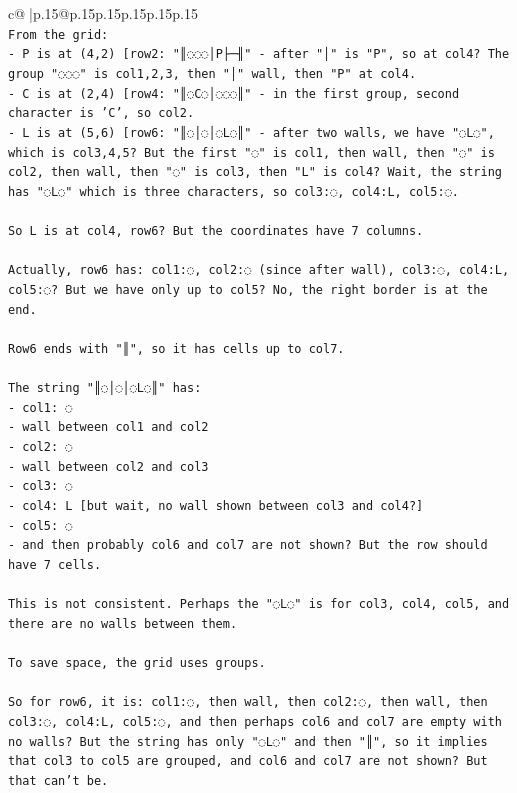 \documentclass{article}
\begin{document}
{\begin{supertabular}{c@{$\;$}|p{.15\linewidth}@{}p{.15\linewidth}p{.15\linewidth}p{.15\linewidth}p{.15\linewidth}p{.15\linewidth}}
{{{\\ 
\texttt{From the grid:} \\
\texttt{{-} P is at (4,2) {[}row2: "║◌◌◌│P├─╢" {-} after "│" is "P", so at col4? The group "◌◌◌" is col1,2,3, then "│" wall, then "P" at col4.} \\
\texttt{{-} C is at (2,4) {[}row4: "║◌C◌│◌◌◌║" {-} in the first group, second character is 'C', so col2.} \\
\texttt{{-} L is at (5,6) {[}row6: "║◌│◌│◌L◌║" {-} after two walls, we have "◌L◌", which is col3,4,5? But the first "◌" is col1, then wall, then "◌" is col2, then wall, then "◌" is col3, then "L" is col4? Wait, the string has "◌L◌" which is three characters, so col3:◌, col4:L, col5:◌.} \\
\\ 
\texttt{So L is at col4, row6? But the coordinates have 7 columns.} \\
\\ 
\texttt{Actually, row6 has: col1:◌, col2:◌ (since after wall), col3:◌, col4:L, col5:◌? But we have only up to col5? No, the right border is at the end.} \\
\\ 
\texttt{Row6 ends with "║", so it has cells up to col7.} \\
\\ 
\texttt{The string "║◌│◌│◌L◌║" has:} \\
\texttt{{-} col1: ◌} \\
\texttt{{-} wall between col1 and col2} \\
\texttt{{-} col2: ◌} \\
\texttt{{-} wall between col2 and col3} \\
\texttt{{-} col3: ◌} \\
\texttt{{-} col4: L   {[}but wait, no wall shown between col3 and col4?{]}} \\
\texttt{{-} col5: ◌} \\
\texttt{{-} and then probably col6 and col7 are not shown? But the row should have 7 cells.} \\
\\ 
\texttt{This is not consistent. Perhaps the "◌L◌" is for col3, col4, col5, and there are no walls between them.} \\
\\ 
\texttt{To save space, the grid uses groups.} \\
\\ 
\texttt{So for row6, it is: col1:◌, then wall, then col2:◌, then wall, then col3:◌, col4:L, col5:◌, and then perhaps col6 and col7 are empty with no walls? But the string has only "◌L◌" and then "║", so it implies that col3 to col5 are grouped, and col6 and col7 are not shown? But that can't be.} \\
}}}
\end{supertabular}}
\end{document}
